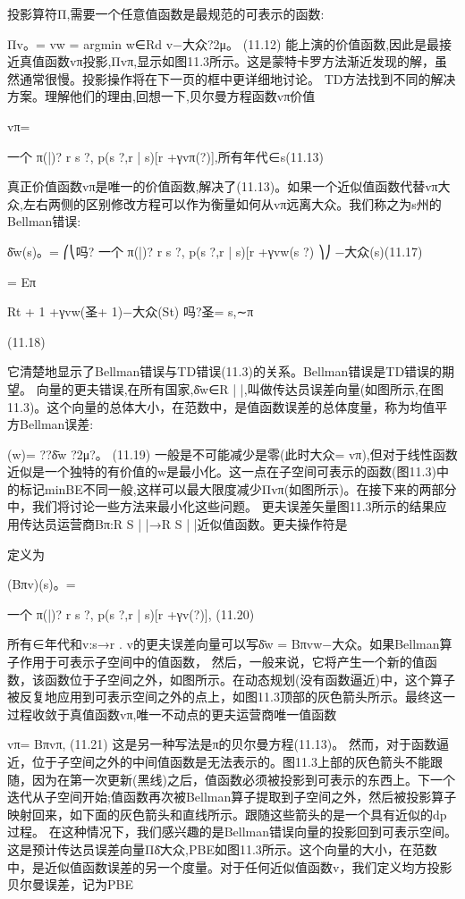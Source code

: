 投影算符Π,需要一个任意值函数是最规范的可表示的函数:

Πv。= vw = argmin
w∈Rd
v−大众?2μ。 					(11.12)
能上演的价值函数,因此是最接近真值函数vπ投影,Πvπ,显示如图11.3所示。这是蒙特卡罗方法渐近发现的解，虽然通常很慢。投影操作将在下一页的框中更详细地讨论。
TD方法找到不同的解决方案。理解他们的理由,回想一下,贝尔曼方程函数vπ价值

vπ=

一个
π(|)?
r s ?,
p(s ?,r | s)[r +γvπ(?)],所有年代∈s(11.13)

真正价值函数vπ是唯一的价值函数,解决了(11.13)。如果一个近似值函数代替vπ大众,左右两侧的区别修改方程可以作为衡量如何从vπ远离大众。我们称之为s州的Bellman错误:


δ̄w(s)。=
⎛⎝吗?
一个
π(|)?
r s ?,
p(s ?,r | s)[r +γvw(s ?)
⎞⎠
−大众(s)(11.17)

= Eπ

Rt + 1 +γvw(圣+ 1)−大众(St)
吗?圣= s,∼π

(11.18)

它清楚地显示了Bellman错误与TD错误(11.3)的关系。Bellman错误是TD错误的期望。
向量的更夫错误,在所有国家,δ̄w∈R | |,叫做传达员误差向量(如图所示,在图11.3)。这个向量的总体大小，在范数中，是值函数误差的总体度量，称为均值平方Bellman误差:

(w)= ??δ̄w ?2μ?。 					(11.19)
一般是不可能减少是零(此时大众= vπ),但对于线性函数近似是一个独特的有价值的w是最小化。这一点在子空间可表示的函数(图11.3)中的标记minBE不同一般,这样可以最大限度减少Πvπ(如图所示)。在接下来的两部分中，我们将讨论一些方法来最小化这些问题。
更夫误差矢量图11.3所示的结果应用传达员运营商Bπ:R S | |→R S | |近似值函数。更夫操作符是

定义为

(Bπv)(s)。=

一个
π(|)?
r s ?,
p(s ?,r | s)[r +γv(?)], 					(11.20)

所有∈年代和v:s→r . v的更夫误差向量可以写δ̄w = Bπvw−大众。如果Bellman算子作用于可表示子空间中的值函数，
然后，一般来说，它将产生一个新的值函数，该函数位于子空间之外，如图所示。在动态规划(没有函数逼近)中，这个算子被反复地应用到可表示空间之外的点上，如图11.3顶部的灰色箭头所示。最终这一过程收敛于真值函数vπ,唯一不动点的更夫运营商唯一值函数

vπ= Bπvπ, 					(11.21)
这是另一种写法是π的贝尔曼方程(11.13)。
然而，对于函数逼近，位于子空间之外的中间值函数是无法表示的。图11.3上部的灰色箭头不能跟随，因为在第一次更新(黑线)之后，值函数必须被投影到可表示的东西上。下一个迭代从子空间开始;值函数再次被Bellman算子提取到子空间之外，然后被投影算子映射回来，如下面的灰色箭头和直线所示。跟随这些箭头的是一个具有近似的dp过程。
在这种情况下，我们感兴趣的是Bellman错误向量的投影回到可表示空间。这是预计传达员误差向量Πδ̄大众,PBE如图11.3所示。这个向量的大小，在范数中，是近似值函数误差的另一个度量。对于任何近似值函数v，我们定义均方投影贝尔曼误差，记为PBE

